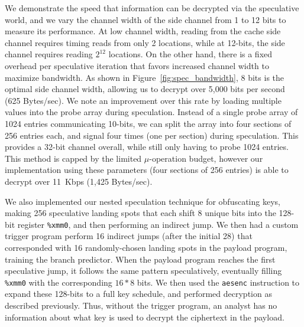 We demonstrate the speed that information can be decrypted via the speculative
world, and we vary the channel width of the side channel from 1 to 12 bits to
measure its performance. At low channel width, reading from the cache side
channel requires timing reads from only 2 locations, while at 12-bits, the side
channel requires reading $2^{12}$ locations. On the other hand, there is a fixed
overhead per speculative iteration that favors increased channel width to
maximize bandwidth. As shown in Figure~\ref{fig:spec_bandwidth}, 8 bits is the
optimal side channel width, allowing us to decrypt over 5,000 bits per second
(625 Bytes/sec). We note an improvement over this rate by loading multiple
values into the probe array during speculation. Instead of a single
probe array of 1024 entries communicating 10-bits, we can split the array into
four sections of 256 entries each, and signal four times (one per section) during
speculation. This provides a 32-bit channel overall, while still only having to probe
1024 entries. This method is capped by the limited $\mu$-operation budget,
however our implementation using these parameters (four sections of 256
entries) is able to decrypt over 11~Kbps (1,425 Bytes/sec).



\smallskip

We also implemented our nested speculation technique for obfuscating keys,
making 256 speculative landing spots that each shift 8 unique bits into the
128-bit register \texttt{\%xmm0}, and then performing an indirect jump. We then
had a custom trigger program perform 16 indirect jumps (after the initial 28)
that corresponded with 16 randomly-chosen landing spots in the payload program,
training the branch predictor. When the payload program reaches the first
speculative jump, it follows the same pattern speculatively, eventually filling
\texttt{\%xmm0} with the corresponding $16*8$ bits. We then used the
\texttt{aesenc} instruction to expand these 128-bits to a full key schedule, and
performed decryption as described previously. Thus, without the trigger program,
an analyst has no information about what key is used to decrypt the ciphertext
in the payload.




